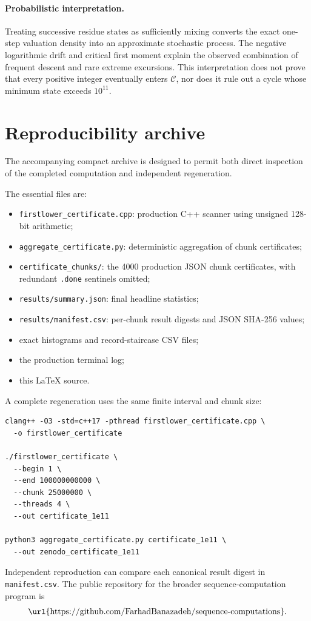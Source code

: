 \documentclass[11pt]{article}
\theoremstyle{definition}
\newcommand{\Cyc}{\mathcal{C}}
\begin{document}
\paragraph{Probabilistic interpretation.}
Treating successive residue states as sufficiently mixing converts the exact one-step valuation density into an approximate stochastic process. The negative logarithmic drift and critical first moment explain the observed combination of frequent descent and rare extreme excursions. This interpretation does not prove that every positive integer eventually enters $\Cyc$, nor does it rule out a cycle whose minimum state exceeds $10^{11}$.

\section{Reproducibility archive}

The accompanying compact archive is designed to permit both direct inspection of the completed computation and independent regeneration.

The essential files are:
\begin{itemize}
\item \texttt{firstlower\_certificate.cpp}: production C++ scanner using unsigned 128-bit arithmetic;
\item \texttt{aggregate\_certificate.py}: deterministic aggregation of chunk certificates;
\item \texttt{certificate\_chunks/}: the 4000 production JSON chunk certificates, with redundant \texttt{.done} sentinels omitted;
\item \texttt{results/summary.json}: final headline statistics;
\item \texttt{results/manifest.csv}: per-chunk result digests and JSON SHA-256 values;
\item exact histograms and record-staircase CSV files;
\item the production terminal log;
\item this \LaTeX{} source.
\end{itemize}

A complete regeneration uses the same finite interval and chunk size:
\begin{Verbatim}[fontsize=\small]
clang++ -O3 -std=c++17 -pthread firstlower_certificate.cpp \
  -o firstlower_certificate

./firstlower_certificate \
  --begin 1 \
  --end 100000000000 \
  --chunk 25000000 \
  --threads 4 \
  --out certificate_1e11

python3 aggregate_certificate.py certificate_1e11 \
  --out zenodo_certificate_1e11
\end{Verbatim}
Independent reproduction can compare each canonical result digest in \texttt{manifest.csv}. The public repository for the broader sequence-computation program is
\[
\text{\url{https://github.com/FarhadBanazadeh/sequence-computations}}.
\]
\end{document}
